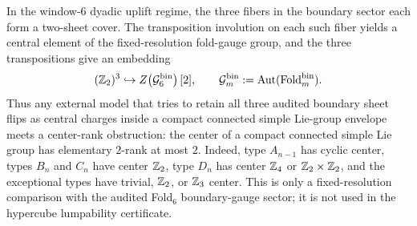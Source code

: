 \begin{remark}\label{rem:window6-center-2rank-excludes-simple-groups}
In the window-\(6\) dyadic uplift regime, the three fibers in the boundary sector each form a two-sheet cover.  The transposition involution on each such fiber yields a central element of the fixed-resolution fold-gauge group, and the three transpositions give an embedding
\[
(\mathbb{Z}_2)^3\hookrightarrow Z\!\left(\mathcal G_6^{\mathrm{bin}}\right)[2],
\qquad
\mathcal G_m^{\mathrm{bin}}:=\operatorname{Aut}(\operatorname{Fold}_m^{\mathrm{bin}}).
\]
Thus any external model that tries to retain all three audited boundary sheet flips as central charges inside a compact connected simple Lie-group envelope meets a center-rank obstruction: the center of a compact connected simple Lie group has elementary \(2\)-rank at most \(2\).  Indeed, type \(A_{n-1}\) has cyclic center, types \(B_n\) and \(C_n\) have center \(\mathbb{Z}_2\), type \(D_n\) has center \(\mathbb{Z}_4\) or \(\mathbb{Z}_2\times\mathbb{Z}_2\), and the exceptional types have trivial, \(\mathbb{Z}_2\), or \(\mathbb{Z}_3\) center.  This is only a fixed-resolution comparison with the audited Fold\(_6\) boundary-gauge sector; it is not used in the hypercube lumpability certificate.
\end{remark}

